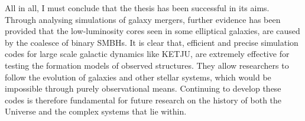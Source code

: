 \documentclass[english, twoside]{HYgradu}
\begin{document}


All in all, I must conclude that the thesis has been successful in its aims. Through analysing simulations of galaxy mergers, further evidence has been provided that the low-luminosity cores seen in some elliptical galaxies, are caused by the coalesce of binary SMBHs. It is clear that, efficient and precise simulation codes for large scale galactic dynamics like KETJU, are extremely effective for testing the formation models of observed structures. They allow researchers to follow the evolution of galaxies and other stellar systems, which would be impossible through purely observational means. Continuing to develop these codes is therefore fundamental for future research on the history of both the Universe and the complex systems that lie within.


\end{document}
